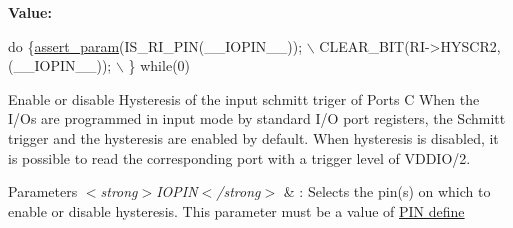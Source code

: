 {\bfseries Value\-:}
\begin{DoxyCode}
\textcolor{keywordflow}{do} \{\hyperlink{stm32l1xx__hal__conf_8h_a631dea7b230e600555f979c62af1de21}{assert\_param}(IS\_RI\_PIN(\_\_IOPIN\_\_)); \(\backslash\)
            CLEAR\_BIT(RI->HYSCR2, (\_\_IOPIN\_\_)); \(\backslash\)
          \} \textcolor{keywordflow}{while}(0)
\end{DoxyCode}


Enable or disable Hysteresis of the input schmitt triger of Ports C When the I/\-Os are programmed in input mode by standard I/\-O port registers, the Schmitt trigger and the hysteresis are enabled by default. When hysteresis is disabled, it is possible to read the corresponding port with a trigger level of V\-D\-D\-I\-O/2. 


\begin{DoxyParams}{Parameters}
{\em $<$strong$>$\-I\-O\-P\-I\-N$<$/strong$>$} & \-: Selects the pin(s) on which to enable or disable hysteresis. This parameter must be a value of \hyperlink{group___r_i___pin}{P\-I\-N define} \\
\hline
\end{DoxyParams}

